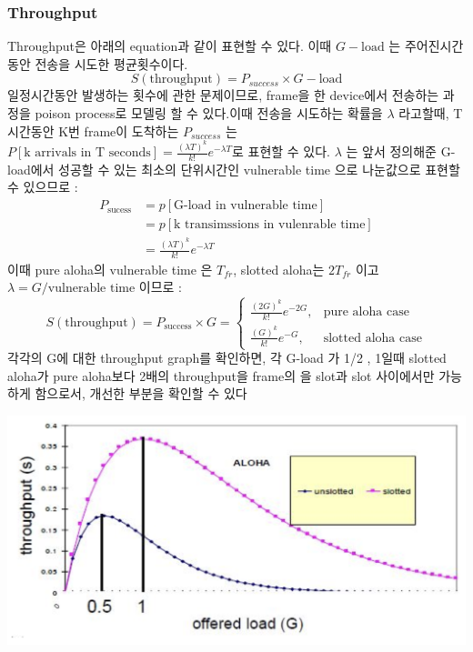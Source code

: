 \begin{multicols}{2}
\vspace{-2mm}
\subsubsection*{Throughput}
\vspace{-2mm}
Throughput은 아래의 equation과 같이 표현할 수 있다. 이때 $G-\text{load}$ 는 주어진시간동안 전송을 시도한 평균횟수이다. 
$$
S(\text{throughput}) = P_{success} \times G-\text{load}
$$
일정시간동안 발생하는 횟수에 관한 문제이므로, frame을 한 device에서 전송하는 과정을 poison process로 모델링 할 수 있다.이때 전송을 시도하는 확률을 $\lambda$ 라고할때,   T 시간동안 K번 frame이 도착하는 $P_{success}$ 는 $P[\text{k arrivals in T seconds}] = \frac{(\lambda T)^k}{k!} e^{-\lambda T}$로 표현할 수 있다.  $\lambda$ 는 앞서 정의해준 G-load에서 성공할 수 있는 최소의 단위시간인 vulnerable time 으로 나눈값으로  표현할 수 있으므로 :
\begin{align*}
  P_{\text{sucess}} &= p[\text{G-load in vulnerable time}]\\
   &= p[\text{k  transimssions in vulenrable time}] \\
   &= \frac{(\lambda T)^k}{k!} e^{-\lambda T}
\end{align*}
이때 pure aloha의 vulnerable time 은 $T_{fr}$, slotted aloha는 $2T_{fr}$ 이고 $\lambda = G / \text{vulnerable time}$ 이므로 : 
$$
S(\text{throughput})= P_{\text{success}} \times G =
\begin{cases}
\frac{(2G)^k}{k!}e^{-2G}, & \mbox{pure aloha case}\\
\frac{(G)^k}{k!}e^{-G}, & \mbox{slotted aloha case}
\end{cases}
$$
각각의 G에 대한 throughput graph를 확인하면, 각 G-load 가 1/2 , 1일때 slotted aloha가 pure aloha보다 2배의 throughput을 frame의 을 slot과 slot 사이에서만 가능하게 함으로서,  개선한 부분을 확인할 수 있다\\
    \begin{minipage}{\columnwidth}
    \vspace{2mm}
    \centering%
    \includegraphics[width=.9\textwidth]{image/week12/1-4.png}
    \vspace{-2mm}
    \vspace{-4mm}
    \end{minipage}
\vspace{-2mm}
%
%

\end{multicols}
